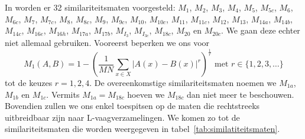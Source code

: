In \cite{vanderweken:similariteitsmaten} worden er 32 similariteitsmaten voorgesteld: $M_1$, $M_2$,
$M_3$, $M_4$, $M_5$, $M_{5c}$, $M_6$, $M_{6c}$, $M_7$, $M_{7c}$, $M_8$, $M_{8c}$, $M_9$, $M_{9c}$,
$M_{10}$, $M_{10c}$, $M_{11}$, $M_{11c}$, $M_{12}$, $M_{13}$, $M_{14a}$, $M_{14b}$, $M_{14c}$, 
$M_{16e}$, $M_{16h}$, $M_{17a}$, $M_{17b}$, $M_{I_3}$, $M_{I_{3c}}$, $M_{18c}$, $M_{20}$ en $M_{20c}$.
We gaan deze echter niet allemaal gebruiken. Vooreerst beperken we ons voor
$$
M_1(A,B) = 1 - \left(\frac{1}{M N} \sum_{x \in X} | A(x) - B(x)|^r\right)^\frac{1}{r} \textrm{ met } 
r \in \{1,2,3,\ldots\}
$$ tot de keuzes
$r=1,2,4$. De overeenkomstige similariteitsmaten noemen we $M_{1a}$, $M_{1b}$ en $M_{1c}$. Vermits
$M_{1a}=M_{18c}$ hoeven we $M_{18c}$ dan niet meer te beschouwen. Bovendien zullen we ons enkel
toespitsen op de maten die rechtstreeks uitbreidbaar zijn naar L-vaagverzamelingen. We komen zo tot
de similariteitsmaten die worden weergegeven in tabel~\ref{tab:similatiteitsmaten}. 

